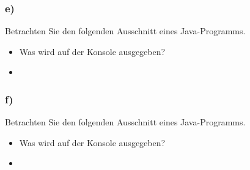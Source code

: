 \begin{frame}[t]%
    \frametitle{\stitle \: e)}

  Betrachten Sie den folgenden Ausschnitt eines Java-Programms.
  
  \begin{itemize}
  \item Was wird auf der Konsole ausgegeben?
  \pause
  \item \code{[1, 4, 9, 16, 25]}
  \end{itemize}
\end{frame}

\begin{frame}[t]%
    \frametitle{\stitle \: f)}

  Betrachten Sie den folgenden Ausschnitt eines Java-Programms.
  
  \begin{itemize}
  \item Was wird auf der Konsole ausgegeben?
  \pause
  \item \code{[5, 4, 3, 2, 1]}
  \end{itemize}
\end{frame}
